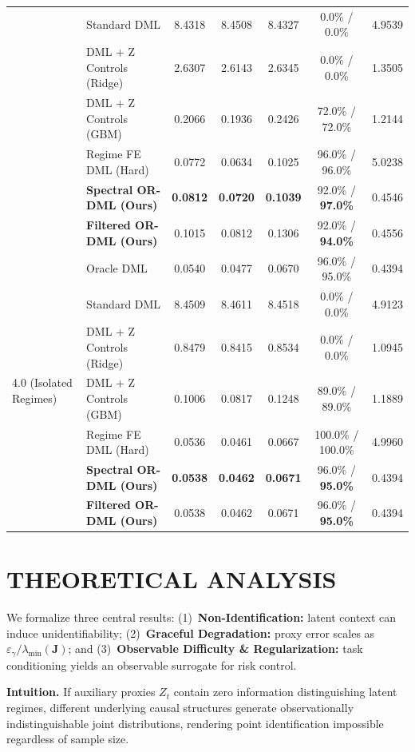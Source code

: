 \documentclass[twoside]{article}
\theoremstyle{definition}
\begin{document}
\begin{table}[t]
{\begin{tabular}{llccccc}
& Standard DML & 8.4318 & 8.4508 & 8.4327 & 0.0\% / 0.0\% & 4.9539 \\
& DML + Z Controls (Ridge) & 2.6307 & 2.6143 & 2.6345 & 0.0\% / 0.0\% & 1.3505 \\
& DML + Z Controls (GBM) & 0.2066 & 0.1936 & 0.2426 & 72.0\% / 72.0\% & 1.2144 \\
& Regime FE DML (Hard) & 0.0772 & 0.0634 & 0.1025 & 96.0\% / 96.0\% & 5.0238 \\
& \textbf{Spectral OR-DML (Ours)} & \textbf{0.0812} & \textbf{0.0720} & \textbf{0.1039} & 92.0\% / \textbf{97.0\%} & 0.4546 \\
& \textbf{Filtered OR-DML (Ours)} & 0.1015 & 0.0812 & 0.1306 & 92.0\% / \textbf{94.0\%} & 0.4556 \\
\midrule
\multirow{7}{*}{4.0 (Isolated Regimes)} 
& Oracle DML & 0.0540 & 0.0477 & 0.0670 & 96.0\% / 95.0\% & 0.4394 \\
& Standard DML & 8.4509 & 8.4611 & 8.4518 & 0.0\% / 0.0\% & 4.9123 \\
& DML + Z Controls (Ridge) & 0.8479 & 0.8415 & 0.8534 & 0.0\% / 0.0\% & 1.0945 \\
& DML + Z Controls (GBM) & 0.1006 & 0.0817 & 0.1248 & 89.0\% / 89.0\% & 1.1889 \\
& Regime FE DML (Hard) & 0.0536 & 0.0461 & 0.0667 & 100.0\% / 100.0\% & 4.9960 \\
& \textbf{Spectral OR-DML (Ours)} & \textbf{0.0538} & \textbf{0.0462} & \textbf{0.0671} & 96.0\% / \textbf{95.0\%} & 0.4394 \\
& \textbf{Filtered OR-DML (Ours)} & 0.0538 & 0.0462 & 0.0671 & 96.0\% / \textbf{95.0\%} & 0.4394 \\
\bottomrule
\end{tabular}%
}
\vspace{-2.5mm}
\end{table}

\section{THEORETICAL ANALYSIS}
\label{sec:theory}

We formalize three central results: (1)~\textbf{Non-Identification:} latent context can induce unidentifiability; (2)~\textbf{Graceful Degradation:} proxy error scales as $\varepsilon_\gamma/\lambda_{\min}(\boldsymbol{J})$; and (3)~\textbf{Observable Difficulty \& Regularization:} task conditioning yields an observable surrogate for risk control.

\textbf{Intuition.} If auxiliary proxies $Z_t$ contain zero information distinguishing latent regimes, different underlying causal structures generate observationally indistinguishable joint distributions, rendering point identification impossible regardless of sample size.
\end{document}
